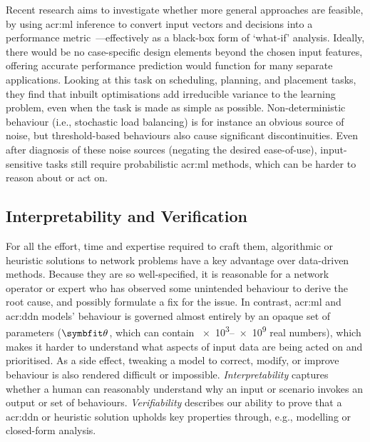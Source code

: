 Recent research aims to investigate whether more general approaches are feasible, by using \gls{acr:ml} inference to convert input vectors and decisions into a performance metric~\parencite{DBLP:conf/nsdi/FuGMR21}---effectively as a black-box form of `what-if' analysis.
Ideally, there would be no case-specific design elements beyond the chosen input features, offering accurate performance prediction would function for many separate applications.
Looking at this task on scheduling, planning, and placement tasks, they find that inbuilt optimisations add irreducible variance to the learning problem, even when the task is made as simple as possible.
Non-deterministic behaviour (i.e., stochastic load balancing) is for instance an obvious source of noise, but threshold-based behaviours also cause significant discontinuities.
Even after diagnosis of these noise sources (negating the desired ease-of-use), input-sensitive tasks still require probabilistic \gls{acr:ml} methods, which can be harder to reason about or act on.

\subsection{Interpretability and Verification}
For all the effort, time and expertise required to craft them, algorithmic or heuristic solutions to network problems have a key advantage over data-driven methods.
Because they are so well-specified, it is reasonable for a network operator or expert who has observed some unintended behaviour to derive the root cause, and possibly formulate a fix for the issue.
In contrast, \gls{acr:ml} and \gls{acr:ddn} models' behaviour is governed almost entirely by an opaque set of parameters ($\wvec{}$, which can contain \numrange{e3}{e9} real numbers), which makes it harder to understand what aspects of input data are being acted on and prioritised.
As a side effect, tweaking a model to correct, modify, or improve behaviour is also rendered difficult or impossible.
\emph{Interpretability} captures whether a human can reasonably understand why an input or scenario invokes an output or set of behaviours.
\emph{Verifiability} describes our ability to prove that a \gls{acr:ddn} or heuristic solution upholds key properties through, e.g., modelling or closed-form analysis.

